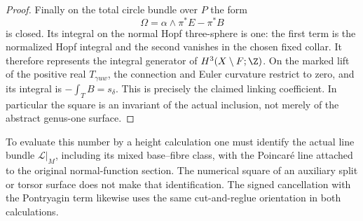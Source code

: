 \begin{proof}
Finally on the total circle bundle over $P$ the form
\[
 \Omega=\alpha\wedge\pi^*E-\pi^*B
\]
is closed. Its integral on the normal Hopf three-sphere is one:
the first term is the normalized Hopf integral and the second
vanishes in the chosen fixed collar. It therefore represents
the integral generator of $H^3(X\setminus F;\Z)$. On the marked
lift of the positive real $T_{\gamma uw}$, the connection and
Euler curvature restrict to zero, and its integral is
$-\int_T B=s_\delta$. This is precisely the claimed linking
coefficient. In particular the square is an invariant of the
actual inclusion, not merely of the abstract genus-one surface.
\end{proof}

\begin{remark}[Scope]
To evaluate this number by a height calculation one must identify
the actual line bundle $\mathcal L|_M$, including its mixed
base--fibre class, with the Poincar\'e line attached to the
original normal-function section. The numerical square of an
auxiliary split or torsor surface does not make that
identification. The signed cancellation with the Pontryagin
term likewise uses the same cut-and-reglue orientation in both
calculations.
\end{remark}

